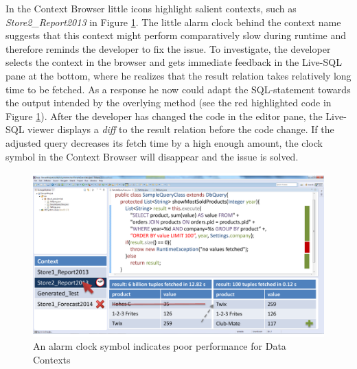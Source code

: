 In the Context Browser little icons highlight salient contexts, such as \emph{Store2\_Report2013} in Figure \ref{fig:final_prototype_slow}. The little alarm clock behind the context name suggests that this context might perform comparatively slow during runtime and therefore reminds the developer to fix the issue. To investigate, the developer selects the context in the browser and gets immediate feedback in the Live-SQL pane at the bottom, where he realizes that the result relation takes relatively long time to be fetched. As a response he now could adapt the SQL-statement towards the output intended by the overlying method (see the red highlighted code in Figure \ref{fig:final_prototype_slow}). After the developer has changed the code in the editor pane, the Live-SQL viewer displays a \emph{diff} to the result relation before the code change. If the adjusted query decreases its fetch time by a high enough amount, the clock symbol in the Context Browser will disappear and the issue is solved.\\
\begin{figure}
\begin{centering}
    \includegraphics[width=1.0\linewidth]{images/slow}
    \caption{An alarm clock symbol indicates poor performance for Data Contexts}
    \label{fig:final_prototype_slow}
\end{centering}
\end{figure}
